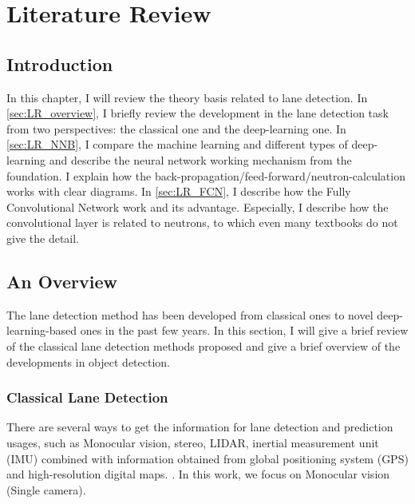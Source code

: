
\chapter{Literature Review}
\label{cha:literature}
\begin{spacing}{1.5}
\setlength{\parskip}{0.3in}

\section{Introduction}

In this chapter, I will review the theory basis related to lane detection. In \autoref{sec:LR_overview}, I briefly review the development in the lane detection task from two perspectives: the classical one and the deep-learning one. In \autoref{sec:LR_NNB}, I compare the machine learning and different types of deep-learning and describe the neural network working mechanism from the foundation. I explain how the back-propagation/feed-forward/neutron-calculation works with clear diagrams. In \autoref{sec:LR_FCN}, I describe how the Fully Convolutional Network work and its advantage. Especially, I describe how the convolutional layer is related to neutrons, to which even many textbooks do not give the detail.

\section{An Overview}
\label{sec:LR_overview}

The lane detection method has been developed from classical ones to novel deep-learning-based ones in the past few years. In this section, I will give a brief review of the classical lane detection methods proposed and give a brief overview of the developments in object detection.

\subsection{Classical Lane Detection}

There are several ways to get the information for lane detection and prediction usages, such as Monocular vision, stereo, LIDAR, inertial measurement unit (IMU) combined with information obtained from global positioning system (GPS) and high-resolution digital maps. \cite{hillel2014recent}. In this work, we focus on Monocular vision (Single camera).


\end{spacing}
